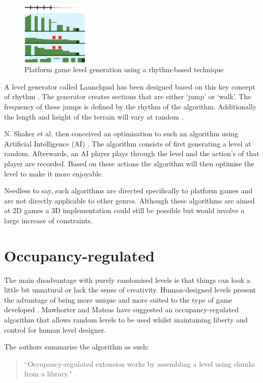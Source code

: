 \begin{figure}[h!]
  \centering
    \includegraphics[width=0.28\textwidth]{images/rhythm.png}
  \caption{Platform game level generation using a rhythm-based technique \citep{DBLP:journals/tciaig/SmithWMTMC11}}
\end{figure}

A level generator called Launchpad has been designed based on this key concept of rhythm \citep{DBLP:journals/tciaig/SmithWMTMC11}.
The generator creates sections that are either `jump' or `walk'. The frequency of these jumps is defined by the rhythm of the algorithm. Additionally the length and height of the terrain will vary at random \citep{DBLP:journals/tciaig/SmithWMTMC11}. 

N. Shaker et al. then conceived an optimisation to such an algorithm using Artificial Intelligence (AI) \citep{DBLP:conf/aiide/ShakerYT10}. The algorithm consists of first generating a level at random. Afterwards, an AI player plays through the level and the action's of that player are recorded. Based on these actions the algorithm will then optimise the level to make it more enjoyable.

Needless to say, such algorithms are directed specifically to platform games and are not directly applicable to other genres. Although these algorithms are aimed at 2D games a 3D implementation could still be possible but would involve a large increase of constraints.


\section{Occupancy-regulated}
The main disadvantage with purely randomised levels is that things can look a little bit unnatural or lack the sense of creativity. Human-designed levels present the advantage of being more unique and more suited to the type of game developed \citep{DBLP:conf/cig/MawhorterM10}. Mawhorter and Mateas have suggested an occupancy-regulated algorithm that allows random levels to be used whilst maintaining liberty and control for human level designer.

The authors summarise the algorithm as such:
\begin{quote}
``Occupancy-regulated extension works by assembling a level using chunks from a library." \citep{DBLP:conf/cig/MawhorterM10}.
\end{quote}

